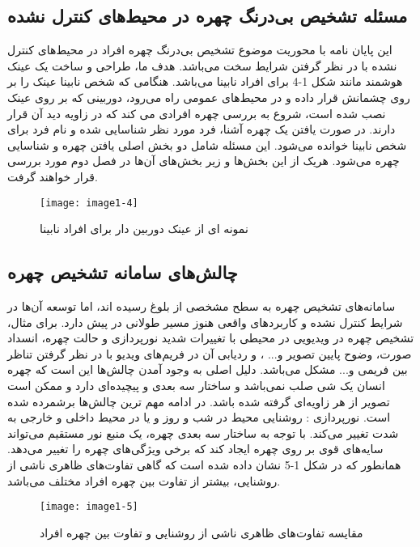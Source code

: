 \subsection{مسئله تشخیص بی‌درنگ چهره در محیط‌های کنترل نشده}
این پایان نامه با محوریت موضوع تشخیص بی‌درنگ چهره افراد در محیط‌های کنترل نشده با در نظر گرفتن شرایط سخت می‌باشد. هدف ما، طراحی و ساخت یک عینک هوشمند مانند شکل 1-4 برای افراد نابینا می‌باشد. هنگامی که شخص نابینا عینک را بر روی چشمانش قرار داده و در محیط‌های عمومی راه می‌رود، دوربینی که بر روی عینک نصب شده است، شروع به بررسی چهره افرادی می کند که در زاویه دید آن قرار دارند. در صورت یافتن یک چهره آشنا، فرد مورد نظر شناسایی شده و نام فرد برای شخص نابینا خوانده می‌شود. این مسئله شامل دو بخش اصلی یافتن چهره و شناسایی چهره می‌شود. هریک از این بخش‌ها و زیر بخش‌های آن‌ها در فصل دوم مورد بررسی قرار خواهند گرفت.

\begin{figure}[!h]
\centering
\texttt{[image: image1-4]}
\caption{نمونه ای از عینک دوربین دار برای افراد نابینا \cite{ref13}}\label{image1-4}
\end{figure}


\subsection{چالش‌های سامانه تشخیص چهره}

سامانه‌های تشخیص چهره به سطح مشخصی از بلوغ رسیده اند، اما توسعه آن‌ها در شرایط کنترل نشده و کاربردهای واقعی هنوز مسیر طولانی در پیش دارد. برای مثال، تشخیص چهره در ویدیویی در محیطی با تغییرات شدید نورپردازی و حالت چهره، انسداد صورت، وضوح پایین تصویر و... ، و ردیابی آن در فریم‌های ویدیو با در نظر گرفتن تناظر بین فریمی و... مشکل می‌باشد. دلیل اصلی به وجود آمدن چالش‌ها این است که چهره انسان یک شی صلب نمی‌باشد و ساختار سه بعدی و پیچیده‌ای دارد و ممکن است تصویر از هر زاویه‌ای گرفته شده باشد. در ادامه مهم ترین چالش‌ها برشمرده شده است.
نورپردازی : روشنایی محیط در شب و روز و یا در محیط داخلی و خارجی به شدت تغییر می‌کند. با توجه به ساختار سه بعدی چهره، یک منبع نور مستقیم می‌تواند سایه‌های قوی بر روی چهره ایجاد کند که برخی ویژگی‌های چهره را تغییر می‌دهد. همانطور که در شکل 1-5 نشان داده شده است که گاهی تفاوت‌های ظاهری ناشی از روشنایی، بیشتر از تفاوت بین چهره افراد مختلف می‌باشد.

\begin{figure}[!h]
\centering
\texttt{[image: image1-5]}
\caption{مقایسه تفاوت‌های ظاهری ناشی از روشنایی و تفاوت بین چهره افراد \cite{ref13}}\label{image1-5}
\end{figure}

